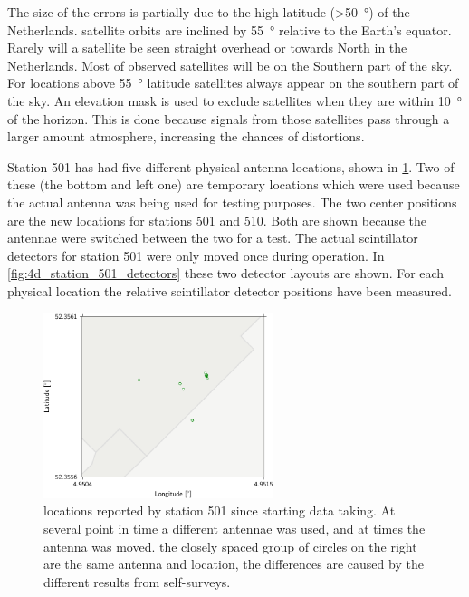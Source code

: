 The size of the errors is partially due to the high latitude (\SI{>50}{\degree}) of the Netherlands. \gps satellite orbits are inclined by \SI{55}{\degree} relative to the Earth's equator. Rarely will a satellite be seen straight overhead or towards North in the Netherlands. Most of observed satellites will be on the Southern part of the sky. For locations above \SI{55}{\degree} latitude \gps satellites always appear on the southern part of the sky. An elevation mask is used to exclude \gps satellites when they are within \SI{10}{\degree} of the horizon. This is done because signals from those satellites pass through a larger amount atmosphere, increasing the chances of distortions.

Station 501 has had five different physical \gps antenna locations, shown in \cref{fig:station_501_4D}. Two of these (the bottom and left one) are temporary locations which were used because the actual \gps antenna was being used for testing purposes. The two center positions are the new \gps locations for stations 501 and 510. Both are shown because the \gps antennae were switched between the two for a test. The actual scintillator detectors for station 501 were only moved once during operation. In \cref{fig:4d_station_501_detectors} these two detector layouts are shown. For each physical \gps location the relative scintillator detector positions have been measured.

\begin{figure}
    \centering
    \includegraphics[width=0.6\textwidth]
                    {plots/cluster/station_501_4D}
    \caption{\gps locations reported by station 501 since starting data taking. At several point in time a different \gps antennae was used, and at times the antenna was moved. the closely spaced group of circles on the right are the same \gps antenna and location, the differences are caused by the different results from self-surveys.}
    \label{fig:station_501_4D}
\end{figure}



